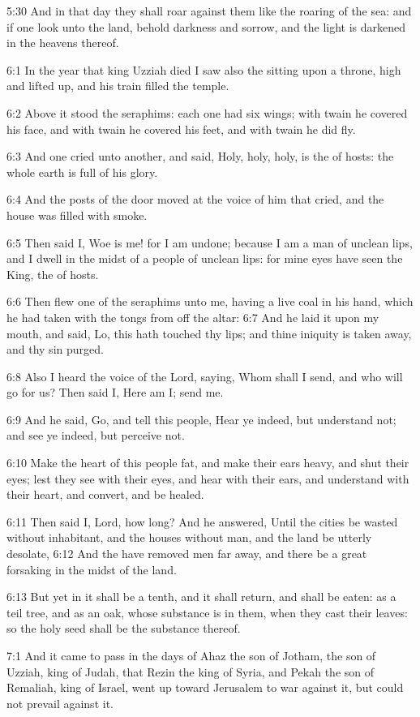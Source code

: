 5:30 And in that day they shall roar against them like the roaring of the sea: and if one look unto the land, behold darkness and sorrow, and the light is darkened in the heavens thereof.

6:1 In the year that king Uzziah died I saw also the \LORD sitting upon a throne, high and lifted up, and his train filled the temple.

6:2 Above it stood the seraphims: each one had six wings; with twain he covered his face, and with twain he covered his feet, and with twain he did fly.

6:3 And one cried unto another, and said, Holy, holy, holy, is the \LORD of hosts: the whole earth is full of his glory.

6:4 And the posts of the door moved at the voice of him that cried, and the house was filled with smoke.

6:5 Then said I, Woe is me! for I am undone; because I am a man of unclean lips, and I dwell in the midst of a people of unclean lips: for mine eyes have seen the King, the \LORD of hosts.

6:6 Then flew one of the seraphims unto me, having a live coal in his hand, which he had taken with the tongs from off the altar: 6:7 And he laid it upon my mouth, and said, Lo, this hath touched thy lips; and thine iniquity is taken away, and thy sin purged.

6:8 Also I heard the voice of the Lord, saying, Whom shall I send, and who will go for us? Then said I, Here am I; send me.

6:9 And he said, Go, and tell this people, Hear ye indeed, but understand not; and see ye indeed, but perceive not.

6:10 Make the heart of this people fat, and make their ears heavy, and shut their eyes; lest they see with their eyes, and hear with their ears, and understand with their heart, and convert, and be healed.

6:11 Then said I, Lord, how long? And he answered, Until the cities be wasted without inhabitant, and the houses without man, and the land be utterly desolate, 6:12 And the \LORD have removed men far away, and there be a great forsaking in the midst of the land.

6:13 But yet in it shall be a tenth, and it shall return, and shall be eaten: as a teil tree, and as an oak, whose substance is in them, when they cast their leaves: so the holy seed shall be the substance thereof.

7:1 And it came to pass in the days of Ahaz the son of Jotham, the son of Uzziah, king of Judah, that Rezin the king of Syria, and Pekah the son of Remaliah, king of Israel, went up toward Jerusalem to war against it, but could not prevail against it.


